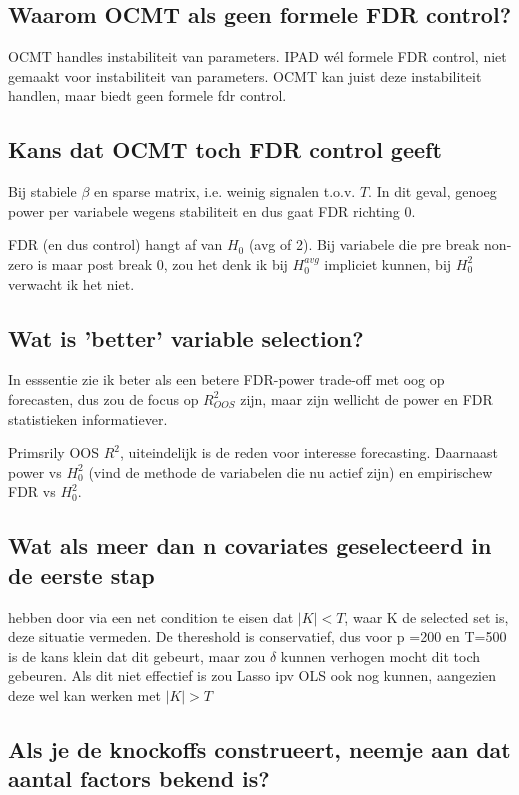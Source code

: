 \documentclass[12pt, a4paper]{article}
\begin{document}
\subsection{Waarom OCMT als geen formele FDR control?} 

OCMT handles instabiliteit van parameters. IPAD wél formele FDR control, niet gemaakt voor instabiliteit van parameters. OCMT kan juist deze instabiliteit handlen, maar biedt geen formele fdr control.

\subsection{Kans dat OCMT toch FDR control geeft}

Bij stabiele $\beta$ en sparse matrix, i.e. weinig signalen t.o.v. $T$. In dit geval, genoeg power per variabele wegens stabiliteit en dus gaat FDR richting 0.

FDR (en dus control) hangt af van $H_0$  (avg of 2). Bij variabele die pre break non-zero is maar post break 0, zou het denk ik bij $H_0^{avg}$ impliciet kunnen, bij $H_0^2$ verwacht ik het niet.

\subsection{Wat is 'better' variable selection?}

In esssentie zie ik beter als een betere FDR-power trade-off met oog op forecasten, dus zou de focus op $R^2_{OOS}$ zijn, maar zijn wellicht de power en FDR statistieken informatiever.

Primsrily OOS $R^2$, uiteindelijk is de reden voor interesse forecasting. Daarnaast power vs $H_0^2$ (vind de methode de variabelen die nu actief zijn) en empirischew FDR vs $H_0^2$.

\subsection{Wat als meer dan n covariates geselecteerd in de eerste stap}

\citet{chudik2018} hebben door via een net condition te eisen dat $|K| < T$, waar K de selected set is, deze situatie vermeden. De thereshold is conservatief, dus voor p =200 en T=500 is de kans klein dat dit gebeurt, maar zou $\delta$ kunnen verhogen mocht dit toch gebeuren. Als dit niet effectief is zou Lasso ipv OLS ook nog kunnen, aangezien deze wel kan werken met $|K| > T$

\subsection{Als je de knockoffs construeert, neemje aan dat aantal factors bekend is? }
\end{document}
